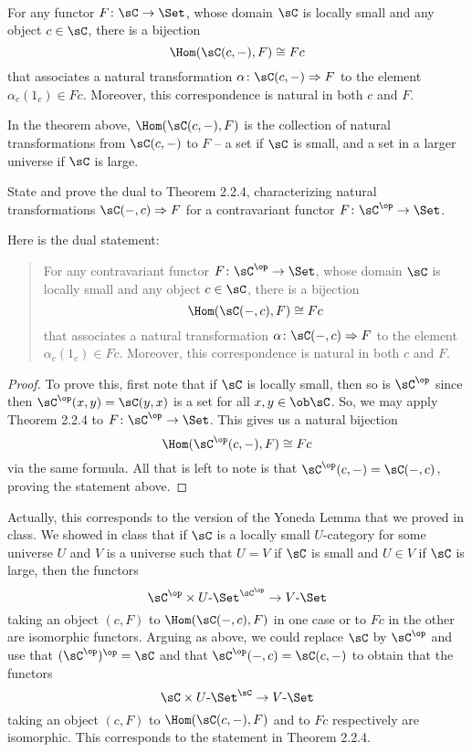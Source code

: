 \documentclass[../../main]{subfiles}
\begin{document}
\paragraph{}
\begin{theorem}
For any functor $F\colon\sC\rightarrow\Set$, whose domain $\sC$ is locally small and any object $c\in\sC$, there is a bijection
\[\Hom(\sC(c,-),F)\cong Fc\]
that associates a natural transformation $\alpha\colon\sC(c,-)\Rightarrow F$ to the element $\alpha_c(1_c)\in Fc$. Moreover, this correspondence is natural in both $c$ and $F$.
\end{theorem}
\popthm

In the theorem above, $\Hom(\sC(c,-),F)$ is the collection of natural transformations from $\sC(c,-)$ to $F$ -- a set if $\sC$ is small, and a set in a larger universe if $\sC$ is large.

\begin{exercise}
State and prove the dual to Theorem 2.2.4, characterizing natural transformations $\sC(-,c)\Rightarrow F$ for a contravariant functor $F\colon\sC^\op\rightarrow\Set$.
\end{exercise}

Here is the dual statement:
\begin{quote}
For any contravariant functor $F\colon\sC^\op\rightarrow\Set$, whose domain $\sC$ is locally small and any object $c\in\sC$, there is a bijection
\[\Hom(\sC(-,c),F)\cong Fc\]
that associates a natural transformation $\alpha\colon\sC(-,c)\Rightarrow F$ to the element $\alpha_c(1_c)\in Fc$. Moreover, this correspondence is natural in both $c$ and $F$.
\end{quote}

\begin{proof}
To prove this, first note that if $\sC$ is locally small, then so is $\sC^\op$ since then $\sC^\op(x,y)=\sC(y,x)$ is a set for all $x,y\in\ob\sC$. So, we may apply Theorem 2.2.4 to $F\colon\sC^\op\rightarrow\Set$. This gives us a natural bijection 
\[\Hom(\sC^\op(c,-),F)\cong Fc\]
via the same formula. All that is left to note is that $\sC^\op(c,-)=\sC(-,c)$, proving the statement above.
\end{proof}

Actually, this corresponds to the version of the Yoneda Lemma that we proved in class. We showed in class that if $\sC$ is a locally small $U$-category for some universe $U$ and $V$ is a universe such that $U=V$ if $\sC$ is small and $U\in V$ if $\sC$ is large, then the functors
\[\sC^\op\times U\mbox{-}\Set^{\sC^\op}\rightarrow V\mbox{-}\Set\]
taking an object $(c,F)$ to $\Hom(\sC(-,c),F)$ in one case or to $Fc$ in the other are isomorphic functors. Arguing as above, we could replace $\sC$ by $\sC^\op$ and use that $(\sC^\op)^\op=\sC$ and that $\sC^\op(-,c)=\sC(c,-)$ to obtain that the functors
\[\sC\times U\mbox{-}\Set^\sC\rightarrow V\mbox{-}\Set\]
taking an object $(c,F)$ to $\Hom(\sC(c,-),F)$ and to $Fc$ respectively are isomorphic. This corresponds to the statement in Theorem 2.2.4.
\end{document}
